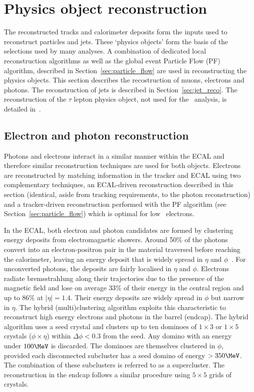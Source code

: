 \section{Physics object reconstruction}

The reconstructed tracks and calorimeter deposits form 
the inputs used to reconstruct particles and jets. These `physics objects'
form the basis of the selections used by many analyses. A combination 
of dedicated local reconstruction algorithms as well as the global event Particle
Flow (PF) algorithm, described in Section~\ref{sec:particle_flow} are used in 
reconstructing the physics objects. This section describes the recostruction
of muons, electrons and photons. The reconstruction of jets
is described in Section~\ref{sec:jet_reco}. The reconstruction of
the $\tau$ lepton physics object, not used for the \alphat~analysis, is 
detailed in~\cite{Khachatryan:2062435}.


\subsection{Electron and photon reconstruction}
\label{sec:ele_pho_reco}

Photons and electrons interact in a similar manner within the ECAL and therefore similar reconstruction techniques
are used for both objects. Electrons are reconstructed by matching 
information in the tracker and ECAL using two complementary techniques, an ECAL-driven 
reconstruction described in this section (identical, aside from tracking
requirements, to the photon reconstruction) and a tracker-driven reconstruction performed with
the PF algorithm (see Section~\ref{sec:particle_flow}) which is optimal for low \pt~electrons. 

In the ECAL, both electron and photon candidates are formed by clustering energy deposits
from electromagnetic showers. Around 50\% of the photons convert into an electron-positron 
pair in the material traversed before reaching the calorimeter, leaving an energy deposit that is widely 
spread in $\eta$ and $\phi$~\cite{electron_photon_reco}.  For unconverted photons, the 
deposits are fairly localised in $\eta$ and $\phi$. Electrons radiate
bremsstrahlung along their trajectories due to the presence of the magnetic field and 
lose on average $33\%$ of their energy in the central region 
and up to $86\%$ at $|\eta| = 1.4$. Their energy deposits are widely spread in $\phi$ but narrow in $\eta$. 
The hybrid (multi)clustering algorithm exploits this characteristic to
reconstruct high energy electrons and photons in the barrel (endcap). The hybrid algorithm
uses a seed crystal and clusters up to ten dominoes of $1\times3$ or $1\times5$ crystals ($\phi\times\eta$) within 
$\Delta\phi < 0.3$ from the seed. Any domino with an energy under $100\MeV$ is discarded. The dominoes
are themselves clustered in $\phi$, provided each disconnected subcluster has a seed 
domino of energy $>350\MeV$. The combination of these subclusters is referred 
to as a supercluster. The reconstruction in the endcap follows a similar procedure 
using $5\times5$ grids of crystals. 

